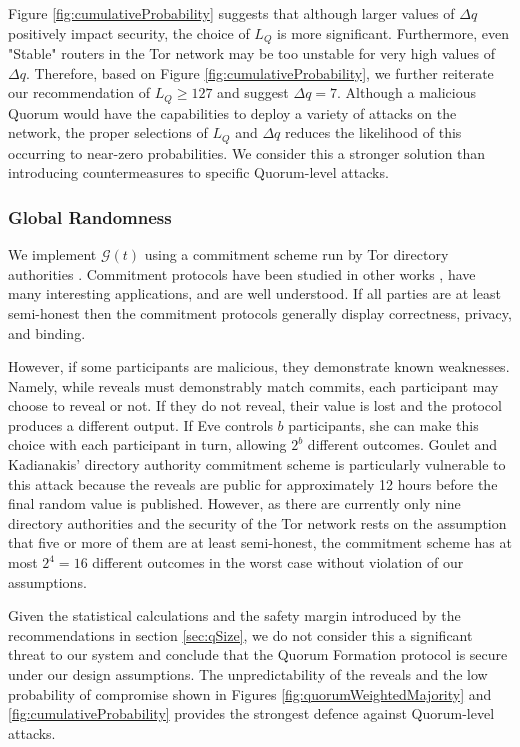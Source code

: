 \documentclass[USenglish,oneside,twocolumn]{article}
\begin{document}
Figure \ref{fig:cumulativeProbability} suggests that although larger values of $ \Delta q $ positively impact security, the choice of $ L_{Q} $ is more significant. Furthermore, even "Stable" routers in the Tor network may be too unstable for very high values of $ \Delta q $. Therefore, based on Figure \ref{fig:cumulativeProbability}, we further reiterate our recommendation of $ L_{Q} \geq 127 $ and suggest $ \Delta q = 7 $. Although a malicious Quorum would have the capabilities to deploy a variety of attacks on the network, the proper selections of $ L_{Q} $ and $ \Delta q $ reduces the likelihood of this occurring to near-zero probabilities. We consider this a stronger solution than introducing countermeasures to specific Quorum-level attacks.

\subsubsection{Global Randomness}
\label{sec:RandGeneration}

We implement $ \mathcal{G}(t) $ using a commitment scheme run by Tor directory authorities \cite{GouletCommitReveal}. Commitment protocols have been studied in other works \cite{rivest1999unconditionally}\cite{naor1990bit}, have many interesting applications, and are well understood. If all parties are at least semi-honest then the commitment protocols generally display correctness, privacy, and binding. 

However, if some participants are malicious, they demonstrate known weaknesses. Namely, while reveals must demonstrably match commits, each participant may choose to reveal or not. If they do not reveal, their value is lost and the protocol produces a different output. If Eve controls $ b $ participants, she can make this choice with each participant in turn, allowing $ 2^{b} $ different outcomes. Goulet and Kadianakis' directory authority commitment scheme is particularly vulnerable to this attack because the reveals are public for approximately 12 hours before the final random value is published. However, as there are currently only nine directory authorities and the security of the Tor network rests on the assumption that five or more of them are at least semi-honest, the commitment scheme has at most $ 2^{4} = 16 $ different outcomes in the worst case without violation of our assumptions. 

Given the statistical calculations and the safety margin introduced by the recommendations in section \ref{sec:qSize}, we do not consider this a significant threat to our system and conclude that the Quorum Formation protocol is secure under our design assumptions. The unpredictability of the reveals and the low probability of compromise shown in Figures \ref{fig:quorumWeightedMajority} and \ref{fig:cumulativeProbability} provides the strongest defence against Quorum-level attacks.
\end{document}
